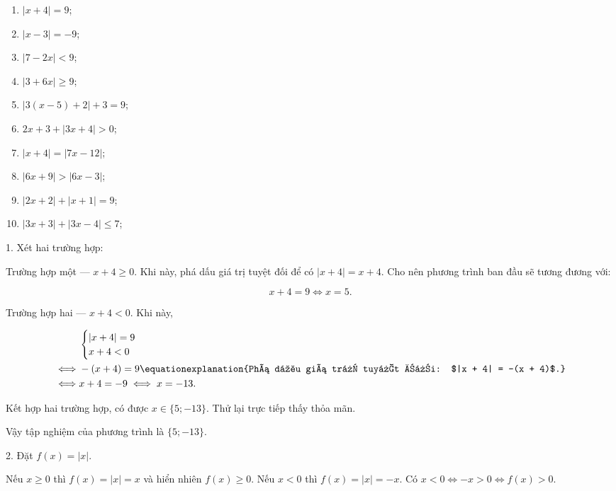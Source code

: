 \begin{multicols}{2}
   \begin{enumerate}
      \item $|x + 4| = 9$;
      \item $|x - 3| = -9$;
      \item $|7 - 2x| < 9$;
      \item $|3 + 6x| \geq 9$;
      \item $\left|3(x - 5) + 2\right| + 3 = 9$;
      \item $2x + 3 + |3x + 4| > 0$;
      \item $|x + 4| = |7x - 12|$;
      \item $|6x + 9| > |6x - 3|$;
      \item $|2x + 2| + |x + 1| = 9$;
      \item $|3x + 3| + |3x - 4| \leq 7$;
   \end{enumerate}
\end{multicols}

\solution

1. Xét hai trường hợp:

\textcolor{colorEmphasisCyan}{Trường hợp một --- $x + 4 \geq 0$}. Khi này, phá dấu giá trị tuyệt đối để có $|x + 4| = x + 4$. Cho nên phương trình ban đầu sẽ tương đương với:

\begin{equation*}
   x + 4 = 9 \iff x = 5.
\end{equation*}

\textcolor{colorEmphasis}{Trường hợp hai --- $x + 4 < 0$}. Khi này,

\begin{align*}
   &\begin{cases}
      |x + 4| = 9 \\
      x + 4 < 0
   \end{cases} \\
   \iff &-(x + 4) = 9 \equationexplanation{Phá dấu giá trị tuyệt đối: $|x + 4| = -(x + 4)$.}\\
   \iff &x + 4 = -9 \iff x = -13.
\end{align*}

Kết hợp hai trường hợp, có được $x \in \{5; -13\}$. Thử lại trực tiếp thấy thỏa mãn.

Vậy tập nghiệm của phương trình là $\{5; -13\}$.

2. Đặt $f(x) = |x|$.

Nếu \textcolor{colorEmphasisCyan}{$x \geq 0$} thì $f(x) = |x| = x$ và hiển nhiên $f(x) \geq 0$. Nếu \textcolor{colorEmphasis}{$x < 0$} thì $f(x) = |x| = -x$. Có $x < 0 \iff -x > 0 \iff f(x) > 0$.

